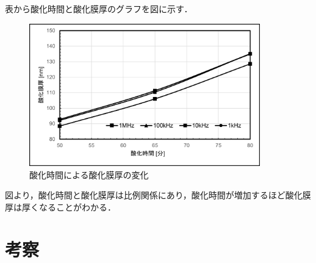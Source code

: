 \documentclass[11pt]{jarticle}
\begin{document}
			表から酸化時間と酸化膜厚のグラフを図に示す．

			\begin{figure}[H]
			\centering
			\includegraphics[width = 10cm]{figs/sankamakuatu.png}
			\caption{酸化時間による酸化膜厚の変化}
			\label{fig:sankajikan-sankamakuatu}
			\end{figure}

			図より，酸化時間と酸化膜厚は比例関係にあり，酸化時間が増加するほど酸化膜厚は厚くなることがわかる．

\section{考察}
\end{document}
